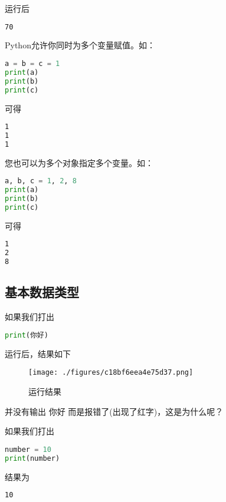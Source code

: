 运行后

\begin{lstlisting}[language=bash]
70
\end{lstlisting}

Python允许你同时为多个变量赋值。如：

\begin{lstlisting}[language=python]
a = b = c = 1
print(a)
print(b)
print(c)
\end{lstlisting}

可得

\begin{lstlisting}[language=bash]
1
1
1
\end{lstlisting}

您也可以为多个对象指定多个变量。如：

\begin{lstlisting}[language=python]
a, b, c = 1, 2, 8
print(a)
print(b)
print(c)
\end{lstlisting}

可得

\begin{lstlisting}[language=bash]
1
2
8
\end{lstlisting}

\subsection{基本数据类型}

如果我们打出

\begin{lstlisting}[language=python]
print(你好)
\end{lstlisting}

运行后，结果如下

\begin{figure}[ht]
\centering
\texttt{[image: ./figures/c18bf6eea4e75d37.png]}
\caption{运行结果} \label{fig_Pyc2_7}
\end{figure}

并没有输出 你好 而是报错了(出现了红字)，这是为什么呢？

如果我们打出

\begin{lstlisting}[language=python]
number = 10
print(number)
\end{lstlisting}

结果为

\begin{lstlisting}[language=bash]
10
\end{lstlisting}

